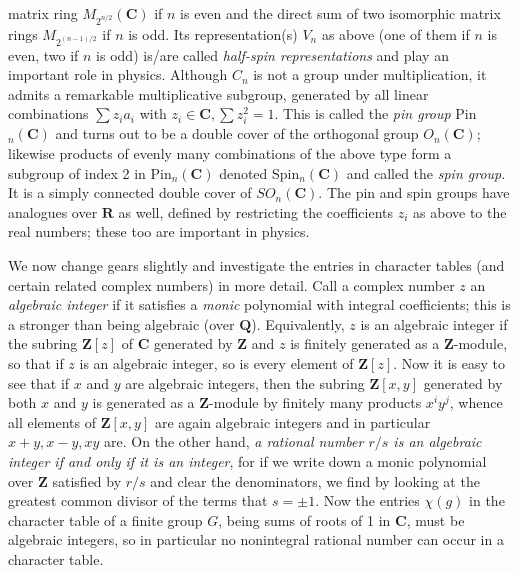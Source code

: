 \documentclass[10pt]{article}
\begin{document}
matrix ring $M_{2^{n/2}}(\mathbf C)$ if $n$ is even and the direct sum
of two isomorphic matrix rings $M_{2^{(n-1)/2}}$ if $n$ is odd. Its
representation(s) $V_n$ as above (one of them if $n$ is even, two if $n$
is odd) is/are called {\sl half-spin representations} and play an
important role in physics. Although $C_n$ is not a group under
multiplication, it admits a remarkable multiplicative subgroup,
generated by all linear combinations $\sum z_i a_i$ with $z_i\in\mathbf
C,\sum z_i^2 = 1$. This is called the {\sl pin group} Pin$_n(\mathbf C)$
and turns out to be a double cover of the orthogonal group $O_n(\mathbf
C)$; likewise products of evenly many combinations of the above type
form a subgroup of index 2 in Pin$_n(\mathbf C)$ denoted Spin$_n(\mathbf
C)$ and called the {\sl spin group}. It is a simply connected double
cover of $SO_n(\mathbf C)$. The pin and spin groups have analogues over
$\mathbf R$ as well, defined by restricting the coefficients $z_i$ as
above to the real numbers; these too are important in physics.

We now change gears slightly and investigate the entries in character
tables (and certain related complex numbers) in more detail. Call a
complex number $z$ an {\sl algebraic integer} if it satisfies a {\sl
  monic} polynomial with integral coefficients; this is a stronger than
being algebraic (over $\mathbf Q$). Equivalently, $z$ is an algebraic
integer if the subring $\mathbf Z[z]$ of $\mathbf C$ generated by
$\mathbf Z$ and $z$ is finitely generated as a $\mathbf Z$-module, so
that if $z$ is an algebraic integer, so is every element of $\mathbf
Z[z]$. Now it is easy to see that if $x$ and $y$ are algebraic integers,
then the subring $\mathbf Z[x,y]$ generated by both $x$ and $y$ is
generated as a $\mathbf Z$-module by finitely many products $x^i y^j$,
whence all elements of $\mathbf Z[x,y]$ are again algebraic integers and
in particular $x+y,x-y,xy$ are. On the other hand, {\sl a rational
  number $r/s$ is an algebraic integer if and only if it is an integer},
for if we write down a monic polynomial over $\mathbf Z$ satisfied by
$r/s$ and clear the denominators, we find by looking at the greatest
common divisor of the terms that $s=\pm1$. Now the entries $\chi(g)$ in
the character table of a finite group $G$, being sums of roots of 1 in
$\mathbf C$, must be algebraic integers, so in particular no nonintegral
rational number can occur in a character table.
\end{document}
